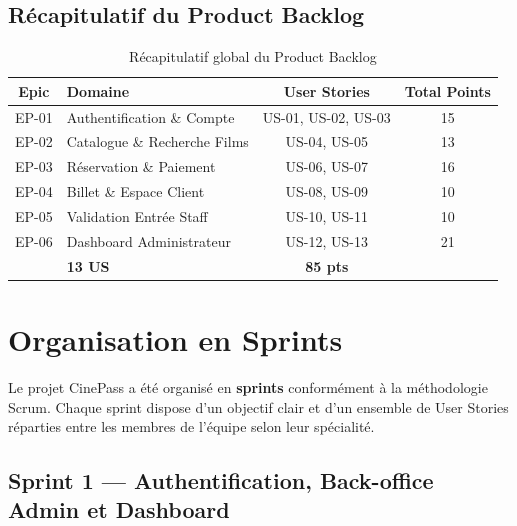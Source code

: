 \documentclass[12pt]{report}
\begin{document}
\subsection*{Récapitulatif du Product Backlog}
 
\begin{table}[H]
\centering
\renewcommand{\arraystretch}{1.4}
\begin{tabular}{|c|l|c|c|}
\hline
\rowcolor{gray!20}
\textbf{Epic} & \textbf{Domaine} 
              & \textbf{User Stories} & \textbf{Total Points} \\
\hline
EP-01 & Authentification \& Compte       & US-01, US-02, US-03 & 15 \\
\hline
EP-02 & Catalogue \& Recherche Films     & US-04, US-05 & 13 \\
\hline
EP-03 & Réservation \& Paiement          & US-06, US-07 & 16 \\
\hline
EP-04 & Billet \& Espace Client          & US-08, US-09 & 10 \\
\hline
EP-05 & Validation Entrée Staff          & US-10, US-11 & 10 \\
\hline
EP-06 & Dashboard Administrateur         & US-12, US-13 & 21 \\
\hline
\rowcolor{gray!10}
\multicolumn{2}{|c|}{\textbf{Total}} & \textbf{13 US} & \textbf{85 pts} \\
\hline
\end{tabular}
\caption{Récapitulatif global du Product Backlog}
\label{tab:backlog_recap}
\end{table}
 
\section{Organisation en Sprints}
 
Le projet CinePass a été organisé en \textbf{sprints}
conformément à la méthodologie Scrum. Chaque sprint dispose
d'un objectif clair et d'un ensemble de User Stories
réparties entre les membres de l'équipe selon leur
spécialité.
 
\subsection{Sprint 1 — Authentification, Back-office Admin et Dashboard}
 
\end{document}
